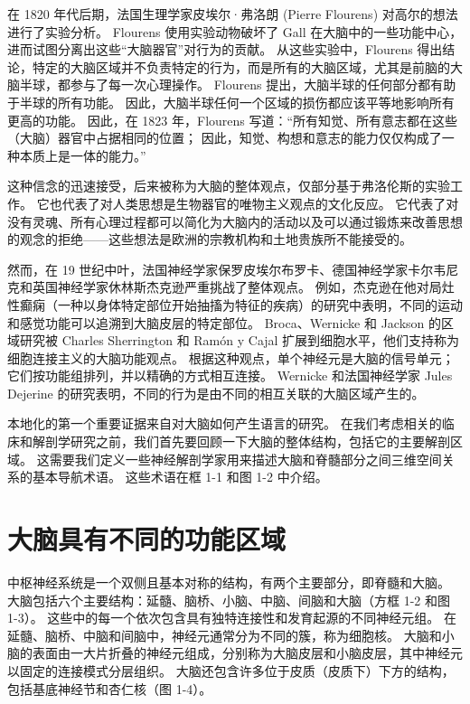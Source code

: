 在 1820 年代后期，法国生理学家皮埃尔·弗洛朗 (Pierre Flourens) 对高尔的想法进行了实验分析。 
Flourens 使用实验动物破坏了 Gall 在大脑中的一些功能中心，进而试图分离出这些“大脑器官”对行为的贡献。 
从这些实验中，Flourens 得出结论，特定的大脑区域并不负责特定的行为，而是所有的大脑区域，尤其是前脑的大脑半球，都参与了每一次心理操作。 
Flourens 提出，大脑半球的任何部分都有助于半球的所有功能。 
因此，大脑半球任何一个区域的损伤都应该平等地影响所有更高的功能。 
因此，在 1823 年，Flourens 写道：“所有知觉、所有意志都在这些（大脑）器官中占据相同的位置； 因此，知觉、构想和意志的能力仅仅构成了一种本质上是一体的能力。”


这种信念的迅速接受，后来被称为大脑的整体观点，仅部分基于弗洛伦斯的实验工作。 
它也代表了对人类思想是生物器官的唯物主义观点的文化反应。 
它代表了对没有灵魂、所有心理过程都可以简化为大脑内的活动以及可以通过锻炼来改善思想的观念的拒绝——这些想法是欧洲的宗教机构和土地贵族所不能接受的。


然而，在 19 世纪中叶，法国神经学家保罗皮埃尔布罗卡、德国神经学家卡尔韦尼克和英国神经学家休林斯杰克逊严重挑战了整体观点。 
例如，杰克逊在他对局灶性癫痫（一种以身体特定部位开始抽搐为特征的疾病）的研究中表明，不同的运动和感觉功能可以追溯到大脑皮层的特定部位。 
Broca、Wernicke 和 Jackson 的区域研究被 Charles Sherrington 和 Ramón y Cajal 扩展到细胞水平，他们支持称为细胞连接主义的大脑功能观点。 根据这种观点，单个神经元是大脑的信号单元； 
它们按功能组排列，并以精确的方式相互连接。 Wernicke 和法国神经学家 Jules Dejerine 的研究表明，不同的行为是由不同的相互关联的大脑区域产生的。


本地化的第一个重要证据来自对大脑如何产生语言的研究。 
在我们考虑相关的临床和解剖学研究之前，我们首先要回顾一下大脑的整体结构，包括它的主要解剖区域。 
这需要我们定义一些神经解剖学家用来描述大脑和脊髓部分之间三维空间关系的基本导航术语。 
这些术语在框 1-1 和图 1-2 中介绍。


\section{大脑具有不同的功能区域}

中枢神经系统是一个双侧且基本对称的结构，有两个主要部分，即脊髓和大脑。 
大脑包括六个主要结构：延髓、脑桥、小脑、中脑、间脑和大脑（方框 1-2 和图 1-3）。 
这些中的每一个依次包含具有独特连接性和发育起源的不同神经元组。 
在延髓、脑桥、中脑和间脑中，神经元通常分为不同的簇，称为细胞核。 
大脑和小脑的表面由一大片折叠的神经元组成，分别称为大脑皮层和小脑皮层，其中神经元以固定的连接模式分层组织。 
大脑还包含许多位于皮质（皮质下）下方的结构，包括基底神经节和杏仁核（图 1-4）。


